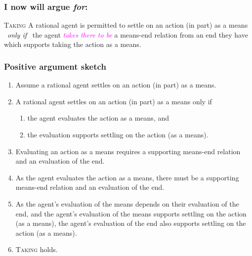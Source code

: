 \documentclass[noamssymb,
graphics,
]{beamer} %
\newcommand{\schemaName}[1]{\textsc{#1}}
\begin{document}
\begin{frame}
  \frametitle{I now will argue \emph{for}:}

  \begin{block}{\schemaName{Taking}}
    A rational agent is permitted to settle on an action (in part) as a means
    \newline
    \mbox{ }\hfill\emph{only if}\hfill\mbox{ }
    \newline
    the agent \textcolor{fuchsia}{\emph{takes there to be}} a means-end relation from an end they have which supports taking the action as a means.
  \end{block}
\end{frame}

\begin{frame}
  \frametitle{Positive argument sketch}
  \begin{enumerate}
  \item Assume a rational agent settles on an action (in part) as a means.
  \item A rational agent settles on an action (in part) as a means only if
    \begin{enumerate}
    \item the agent evaluates the action as a means, and
    \item the evaluation supports settling on the action (as a means).
    \end{enumerate}
  \item Evaluating an action as a means requires a supporting means-end relation and an evaluation of the end.
  \item As the agent evaluates the action as a means, there must be a supporting means-end relation and an evaluation of the end.
  \item As the agent's evaluation of the means depends on their evaluation of the end, and the agent's evaluation of the means supports settling on the action (as a means), the agent's evaluation of the end also supports settling on the action (as a means).
  \item \schemaName{Taking} holds.
  \end{enumerate}
\end{frame}
\end{document}

